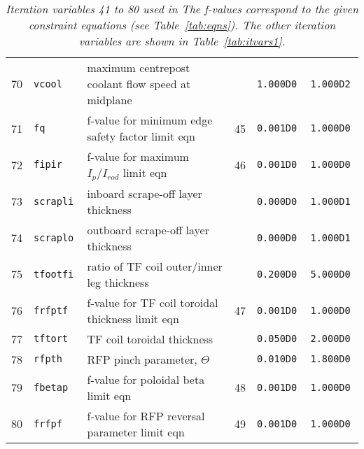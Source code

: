 \begin{table}[tbph]
\begin{center}
\begin{tabular}{||c|l|l|c|c|c||}
70  & \tt vcool	      & maximum centrepost coolant flow speed at midplane       &           & \tt 1.000D0  & \tt 1.000D2 \\
71  & \tt fq          & f-value for minimum edge safety factor limit eqn        & 45        & \tt 0.001D0  & \tt 1.000D0 \\
72  & \tt fipir       & f-value for maximum $I_p/I_{rod}$ limit eqn             & 46        & \tt 0.001D0  & \tt 1.000D0 \\
73  & \tt scrapli     & inboard scrape-off layer thickness                      &           & \tt 0.000D0  & \tt 1.000D1 \\
74  & \tt scraplo     & outboard scrape-off layer thickness                     &           & \tt 0.000D0  & \tt 1.000D1 \\
75  & \tt tfootfi     & ratio of TF coil outer/inner leg thickness              &           & \tt 0.200D0  & \tt 5.000D0 \\
76  & \tt frfptf      & f-value for TF coil toroidal thickness limit eqn        & 47        & \tt 0.001D0  & \tt 1.000D0 \\
77  & \tt tftort      & TF coil toroidal thickness                              &           & \tt 0.050D0  & \tt 2.000D0 \\
78  & \tt rfpth       & RFP pinch parameter, $\Theta$                           &           & \tt 0.010D0  & \tt 1.800D0 \\
79  & \tt fbetap      & f-value for poloidal beta limit eqn                     & 48        & \tt 0.001D0  & \tt 1.000D0 \\
80  & \tt frfpf       & f-value for RFP reversal parameter limit eqn            & 49        & \tt 0.001D0  & \tt 1.000D0 \\ \hline
\end{tabular}
\end{center}
\caption[TABLE_VARS2]{{\it
Iteration variables 41 to 80 used in \PSD The f-values correspond to the
given constraint equations (see Table~\ref{tab:eqns}). The other iteration
variables are shown in Table~\ref{tab:itvars1}. }}
\label{tab:itvars2}
\end{table}
\normalsize
